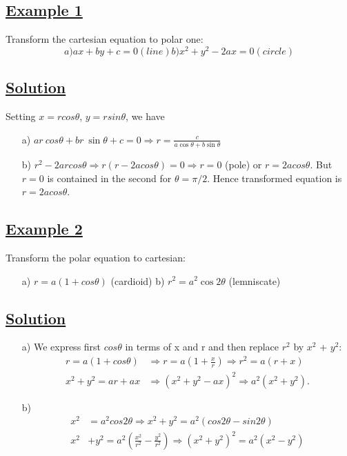 \documentclass{amsbook}
\begin{document}

\subsection*{\underline{Example 1}} Transform the cartesian equation to polar one:
\begin{equation*}
	a) ax + by + c = 0 (line) b) x^2 + y^2 - 2ax = 0 (circle)
\end{equation*} 

\subsection*{\underline{Solution}} 
Setting $x = r cos\theta$, $y = r sin\theta$, we have \\

\begin{itemize}
    \item [a)] $ar\ cos\theta + br\ \sin\theta + c = 0 \Rightarrow r = \frac{c}{a \cos\theta + b \sin\theta}$
    \item [b)] $r^2 - 2ar cos\theta \Rightarrow r (r - 2a cos\theta) = 0 \Rightarrow r = 0$ (pole) or $r = 2a cos\theta$. But $r = 0$ is contained in the second for $\theta = \pi/2$. Hence transformed equation is $r = 2a cos\theta$.
\end{itemize}

\subsection*{\underline{Example 2}} Transform the polar equation to cartesian:

\begin{itemize}
    \item[a)]  $r = a (1 + cos\theta)$ (cardioid)
    b) $r^2 = a^2 \cos{2\theta}$ (lemniscate)
\end{itemize}

\subsection*{\underline{Solution}} 

\begin{itemize}
    \item[a)] We express first $cos\theta$ in terms of x and r and then replace $r^2$ by $x^2$ + $y^2$:
    \begin{align*}
    r = a (1 + cos\theta) &\Rightarrow r = a (1 + \frac{x}{r}) \Rightarrow r^2 = a (r + x) \\
    x^2 + y^2 = ar + ax &\Rightarrow (x^2 + y^2 - ax)^2 \Rightarrow a^2 (x^2 + y^2).
    \end{align*}

    \item[b)]
    \begin{align*}
    x^2 &= a^2 cos{2\theta} \Rightarrow x^2 + y^2 = a^2(cos{2}{\theta} - sin{2}{\theta}) \\
    x^2 &+ y^2 = a^2(\frac{x^2}{r^2} - \frac{y^2}{r^2}) \Rightarrow (x^2 + y^2)^2 = a^2 (x^2 - y^2)
    \end{align*}
    
\end{itemize}
\end{document}
